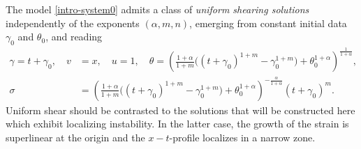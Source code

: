 \documentclass[a4paper,11pt]{article}
\theoremstyle{remark}
\begin{document}
The model \eqref{intro-system0} admits a class of {\it uniform shearing solutions} independently of the exponents $(\alpha,m,n)$, emerging from constant initial
data $\gamma_0$ and $\theta_0$, and  reading
\begin{equation} \label{intro:uss}
 \begin{aligned}
 \gamma = t+\gamma_0, \quad v&=x, \quad u=1, \quad \theta = \left( \frac{1+\alpha}{1+m} \big( (t+\gamma_0)^{1+m}-\gamma_0^{1+m}\big) + \theta_0^{1+\alpha}\right)^{\frac{1}{1+\alpha}}, \\
 \sigma&=\left( \frac{1+\alpha}{1+m} \big( (t+\gamma_0)^{1+m}-\gamma_0^{1+m}\big) + \theta_0^{1+\alpha} \right)^{-\frac{\alpha}{1+\alpha}}(t+\gamma_0)^m.
 \end{aligned}
\end{equation}
Uniform shear should be contrasted to the solutions that will be constructed here which exhibit localizing instability.
 In the latter case, the growth of the strain is superlinear at the origin and the $x-t$-profile localizes in a narrow zone.%

\end{document}
